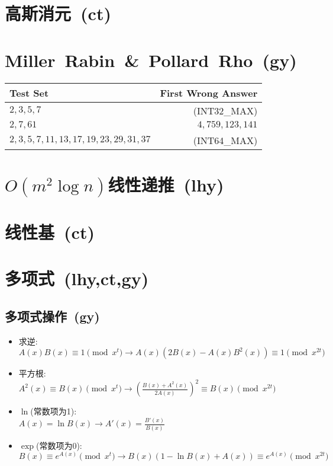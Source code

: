 \section{高斯消元\ \small(ct)}
\section{Miller\ Rabin\ \&\ Pollard\ Rho\ \small(gy)}
    \begin{tabular}{l r}
        \hline
        Test Set & First Wrong Answer\\\hline
        $ 2, 3, 5, 7 $ & (INT32\_MAX)\\\hline
        $ 2, 7, 61 $ & $ 4,759,123,141 $\\\hline
        $ 2, 3, 5, 7, 11, 13, 17, 19, 23, 29, 31, 37 $ & (INT64\_MAX)\\\hline
    \end{tabular}
\section{$ O(m ^ 2 \log n) $线性递推\ \small(lhy)}
\section{线性基\ \small(ct)}
\section{多项式\ \small(lhy,ct,gy)}
    \subsection*{多项式操作\ \small(gy)}
        \begin{itemize}[wide=0pt]
            \item 求逆:
            \\$ A(x) B(x) \equiv 1 \pmod{x^t} \to A(x) (2B(x) - A(x) B^2(x)) \equiv 1 \pmod{x^{2t}} $
            \item 平方根:
            \\$ A^2(x) \equiv B(x) \pmod{x^t} \to (\frac{B(x) + A^2(x)}{2A(x)})^2 \equiv B(x) \pmod{x^{2t}} $
            \item $ \ln $(常数项为1):
            \\$ A(x) = \ln B(x) \to A'(x) = \frac{B'(x)}{B(x)} $
            \item $ \exp $(常数项为0):
            \\$ B(x) \equiv e^{A(x)} \pmod{x^t} \to B(x) (1 - \ln B(x) + A(x)) \equiv e^{A(x)} \pmod{x^{2t}} $
        \end{itemize}
